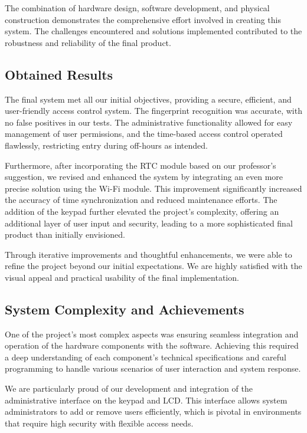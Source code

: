 \documentclass{article}
\begin{document}
The combination of hardware design, software development, and physical construction demonstrates the comprehensive effort involved in creating this system. The challenges encountered and solutions implemented contributed to the robustness and reliability of the final product.

\subsection{Obtained Results}

The final system met all our initial objectives, providing a secure, efficient, and user-friendly access control system. The fingerprint recognition was accurate, with no false positives in our tests. The administrative functionality allowed for easy management of user permissions, and the time-based access control operated flawlessly, restricting entry during off-hours as intended.

Furthermore, after incorporating the RTC module based on our professor's suggestion, we revised and enhanced the system by integrating an even more precise solution using the Wi-Fi module. This improvement significantly increased the accuracy of time synchronization and reduced maintenance efforts. The addition of the keypad further elevated the project's complexity, offering an additional layer of user input and security, leading to a more sophisticated final product than initially envisioned.

Through iterative improvements and thoughtful enhancements, we were able to refine the project beyond our initial expectations. We are highly satisfied with the visual appeal and practical usability of the final implementation.



\subsection{System Complexity and Achievements}
One of the project's most complex aspects was ensuring seamless integration and operation of the hardware components with the software. Achieving this required a deep understanding of each component's technical specifications and careful programming to handle various scenarios of user interaction and system response.

We are particularly proud of our development and integration of the administrative interface on the keypad and LCD. This interface allows system administrators to add or remove users efficiently, which is pivotal in environments that require high security with flexible access needs.
\end{document}
